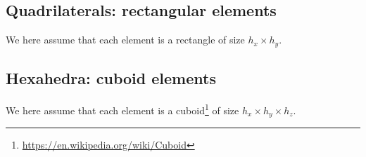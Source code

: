 \subsection{Quadrilaterals: rectangular elements}

We here assume that each element is a rectangle of size $h_x \times h_y$. 




\subsection{Hexahedra: cuboid elements}

We here assume that each element is a cuboid\footnote{\url{https://en.wikipedia.org/wiki/Cuboid}} 
of size $h_x \times h_y \times h_z$. 









